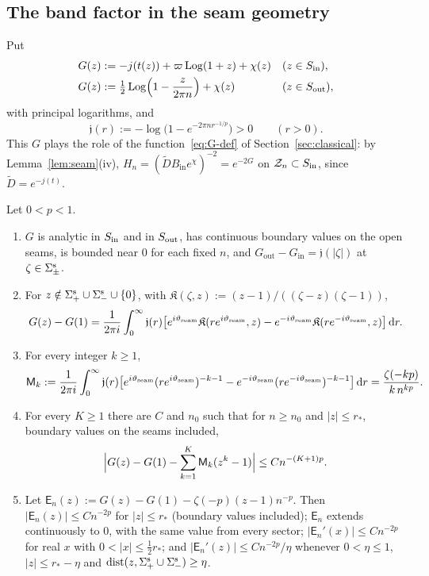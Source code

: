 \subsection{The band factor in the seam geometry}\label{sec:plt1-band}

Put
\begin{equation}\label{eq:plt1-G}
\begin{aligned}
  G(z)&:=-j(t(z))+\varpi\operatorname{Log}(1+z)+\chi(z)&&(z\in S_{\mathrm{in}}),\\
  G(z)&:=\tfrac12\operatorname{Log}\Bigl(1-\frac z{2\pi n}\Bigr)+\chi(z)&&(z\in S_{\mathrm{out}}),
\end{aligned}
\end{equation}
with principal logarithms, and
\begin{equation}\label{eq:plt1-jfun}
  \mathfrak j(r):=-\log\bigl(1-e^{-2\pi nr^{-1/p}}\bigr)>0\qquad(r>0).
\end{equation}
This $G$ plays the role of the function~\eqref{eq:G-def} of Section~\ref{sec:classical}: by Lemma~\ref{lem:seam}(iv),
$H_n=(\tilde DB_{\mathrm{in}}e^\chi)^{-2}=e^{-2G}$ on $\mathcal{Z}_n\subset S_{\mathrm{in}}$, since $\tilde D=e^{-j(t)}$.

\begin{lemma}\label{lem:plt1-band}
Let $0<p<1$.
\begin{enumerate}
\item[(i)] $G$ is analytic in $S_{\mathrm{in}}$ and in $S_{\mathrm{out}}$, has continuous boundary values on the open seams, is bounded near $0$
  for each fixed $n$, and $G_{\mathrm{out}}-G_{\mathrm{in}}=\mathfrak j(|\zeta|)$ at $\zeta\in\Sigma^{\mathrm{s}}_\pm$.
\item[(ii)] For $z\notin\Sigma^{\mathrm{s}}_+\cup\Sigma^{\mathrm{s}}_-\cup\{0\}$, with $\mathfrak K(\zeta,z):=(z-1)/((\zeta-z)(\zeta-1))$,
  \begin{equation}\label{eq:plt1-repr}
    G(z)-G(1)=\frac1{2\pi i}\int_0^\infty\mathfrak j(r)\bigl[e^{i\vartheta_{\mathrm{seam}}}\mathfrak K(re^{i\vartheta_{\mathrm{seam}}},z)-e^{-i\vartheta_{\mathrm{seam}}}\mathfrak K(re^{-i\vartheta_{\mathrm{seam}}},z)\bigr]\,\mathrm{d} r .
  \end{equation}
\item[(iii)] For every integer $k\ge1$,
  \[
    \mathsf M_k:=\frac1{2\pi i}\int_0^\infty\mathfrak j(r)\bigl[e^{i\vartheta_{\mathrm{seam}}}(re^{i\vartheta_{\mathrm{seam}}})^{-k-1}-e^{-i\vartheta_{\mathrm{seam}}}(re^{-i\vartheta_{\mathrm{seam}}})^{-k-1}\bigr]\,\mathrm{d} r
    =\frac{\zeta(-kp)}{k\,n^{kp}} .
  \]
\item[(iv)] For every $K\ge1$ there are $C$ and $n_0$ such that for $n\ge n_0$ and $|z|\le r_*$, boundary values on the
  seams included,
  \[
    \Bigl|G(z)-G(1)-\sum_{k=1}^K\mathsf M_k(z^k-1)\Bigr|\le Cn^{-(K+1)p}.
  \]
\item[(v)] Let $\mathsf E_n(z):=G(z)-G(1)-\zeta(-p)(z-1)n^{-p}$. Then $|\mathsf E_n(z)|\le Cn^{-2p}$ for $|z|\le r_*$
  (boundary values included); $\mathsf E_n$ extends continuously to $0$, with the same value from every sector;
  $|\mathsf E_n'(x)|\le Cn^{-2p}$ for real $x$ with $0<|x|\le\frac12r_*$; and $|\mathsf E_n'(z)|\le Cn^{-2p}/\eta$ whenever
  $0<\eta\le1$, $|z|\le r_*-\eta$ and $\mathrm{dist}(z,\Sigma^{\mathrm{s}}_+\cup\Sigma^{\mathrm{s}}_-)\ge\eta$.
\end{enumerate}
\end{lemma}

